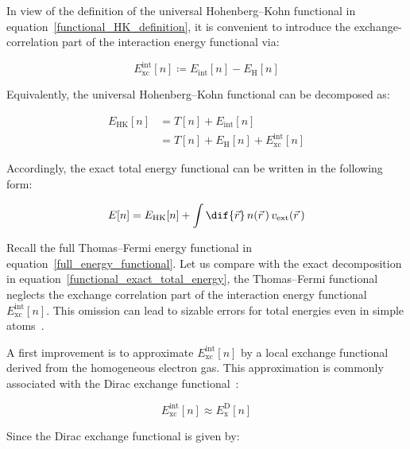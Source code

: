 In view of the definition of the universal Hohenberg--Kohn functional in equation~\eqref{functional_HK_definition},
it is convenient to introduce the exchange-correlation part of the interaction energy functional via:

\begin{equation}
E_\mathrm{xc}^{\mathrm{int}}[n]\coloneqq E_\mathrm{int}[n]-E_\mathrm{H}[n]
\label{Exc_int_definition}
\end{equation}

Equivalently, the universal Hohenberg--Kohn functional can be decomposed as:

\begin{equation}
\begin{aligned}
    E_\mathrm{HK}[n] &= T[n] + E_\mathrm{int}[n] \\
    &= T[n]+E_\mathrm{H}[n]+E_\mathrm{xc}^\mathrm{int}[n]
\end{aligned}
\label{HK_decomposition_Hartree_xc}
\end{equation}

Accordingly, the exact total energy functional can be written in the following form:

\begin{equation}
    E[n]=E_\mathrm{HK}[n]+\int\dif{\vec{r}}\,n(\vec{r}\,)\,v_\mathrm{ext}(\vec{r}\,)
\label{functional_exact_total_energy_HK_form}
\end{equation}

Recall the full Thomas--Fermi energy functional in equation~\eqref{full_energy_functional}.
Let us compare with the exact decomposition in equation~\eqref{functional_exact_total_energy},
the Thomas--Fermi functional neglects the exchange correlation part of the interaction energy functional $E_\mathrm{xc}^\mathrm{int}[n]$.
This omission can lead to sizable errors for total energies even in simple atoms~\cite{schwinger1980thomas, schwinger1981thomas}.

A first improvement is to approximate $E_\mathrm{xc}^\mathrm{int}[n]$ by a local exchange functional derived from the homogeneous electron gas.
This approximation is commonly associated with the Dirac exchange functional~\cite{dirac1930note}:

\begin{equation}
    E_\mathrm{xc}^\mathrm{int}[n]\approx E_\mathrm{x}^\mathrm{D}[n]
\label{Dirac_exchange_approximation}
\end{equation}

Since the Dirac exchange functional is given by:

